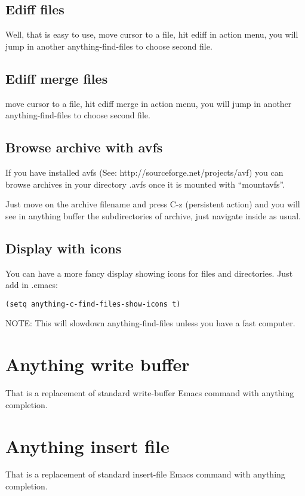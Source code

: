 \documentclass[a4paper,11pt]{article}
\begin{document}
\subsection{Ediff files}
\label{sec:ediff-files}
Well, that is easy to use, 
move cursor to a file, hit ediff in action menu, you will jump in
another anything-find-files to choose second file.
\subsection{Ediff merge files}
\label{sec:ediff-merge-files}
move cursor to a file, hit ediff merge in action menu, you will jump in
another anything-find-files to choose second file.

\subsection{Browse archive with avfs}
\label{sec:browse-archive-with}

If you have installed avfs (See: http://sourceforge.net/projects/avf) you can browse archives
in your directory .avfs once it is mounted with ``mountavfs''.

Just move on the archive filename and press C-z (persistent action) and you will see
in anything buffer the subdirectories of archive, just navigate inside as usual.

\subsection{Display with icons}
\label{sec:display-with-icons}

You can have a more fancy display showing icons for files and directories.
Just add in .emacs:
\begin{verbatim}
(setq anything-c-find-files-show-icons t)
\end{verbatim}
NOTE: This will slowdown anything-find-files unless you have a fast computer.

\section{Anything write buffer}
\label{sec:anyth-write-buff}
That is a replacement of standard write-buffer Emacs command with anything completion.
\section{Anything insert file}
\label{sec:anything-insert-file}
That is a replacement of standard insert-file Emacs command with anything completion.
\end{document}
